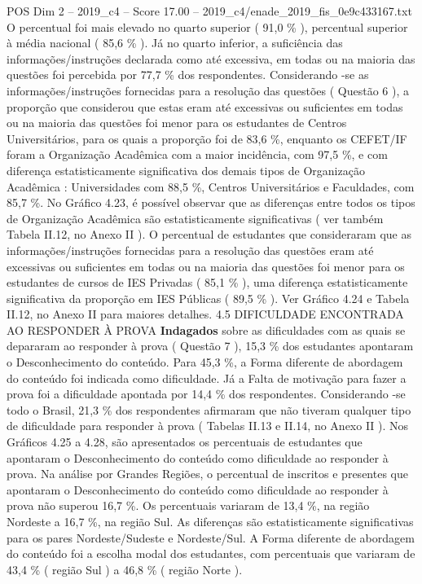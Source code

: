 \begin{textsample}{POS Dim 2 – 2019\_c4 – Score 17.00 – 2019\_c4/enade\_2019\_fis\_0e9c433167.txt}
O percentual foi mais elevado no quarto superior ( 91,0 \% ), percentual superior à média nacional ( 85,6 \% ).
Já no quarto inferior, a suficiência das informações/instruções declarada como até excessiva, em todas ou na maioria das questões foi percebida por 77,7 \% dos respondentes.
Considerando -se as informações/instruções fornecidas para a resolução das questões ( Questão 6 ), a proporção que considerou que estas eram até excessivas ou suficientes em todas ou na maioria das questões foi menor para os estudantes de Centros Universitários, para os quais a proporção foi de 83,6 \%, enquanto os CEFET/IF foram a Organização Acadêmica com a maior incidência, com 97,5 \%, e com diferença estatisticamente significativa dos demais tipos de Organização Acadêmica : Universidades com 88,5 \%, Centros Universitários e Faculdades, com 85,7 \%.
No Gráfico 4.23, é possível observar que as diferenças entre todos os tipos de Organização Acadêmica são estatisticamente significativas ( ver também Tabela II.12, no Anexo II ).
O percentual de estudantes que consideraram que as informações/instruções fornecidas para a resolução das questões eram até excessivas ou suficientes em todas ou na maioria das questões foi menor para os estudantes de cursos de IES Privadas ( 85,1 \% ), uma diferença estatisticamente significativa da proporção em IES Públicas ( 89,5 \% ).
Ver Gráfico 4.24 e Tabela II.12, no Anexo II para maiores detalhes. 4.5 DIFICULDADE ENCONTRADA AO RESPONDER À PROVA \textbf{Indagados} sobre as dificuldades com as quais se depararam ao responder à prova ( Questão 7 ), 15,3 \% dos estudantes apontaram o Desconhecimento do conteúdo.
Para 45,3 \%, a Forma diferente de abordagem do conteúdo foi indicada como dificuldade.
Já a Falta de motivação para fazer a prova foi a dificuldade apontada por 14,4 \% dos respondentes.
Considerando -se todo o Brasil, 21,3 \% dos respondentes afirmaram que não tiveram qualquer tipo de dificuldade para responder à prova ( Tabelas II.13 e II.14, no Anexo II ).
Nos Gráficos 4.25 a 4.28, são apresentados os percentuais de estudantes que apontaram o Desconhecimento do conteúdo como dificuldade ao responder à prova.
Na análise por Grandes Regiões, o percentual de inscritos e presentes que apontaram o Desconhecimento do conteúdo como dificuldade ao responder à prova não superou 16,7 \%.
Os percentuais variaram de 13,4 \%, na região Nordeste a 16,7 \%, na região Sul.
As diferenças são estatisticamente significativas para os pares Nordeste/Sudeste e Nordeste/Sul.
A Forma diferente de abordagem do conteúdo foi a escolha modal dos estudantes, com percentuais que variaram de 43,4 \% ( região Sul ) a 46,8 \% ( região Norte ).

\end{textsample}
